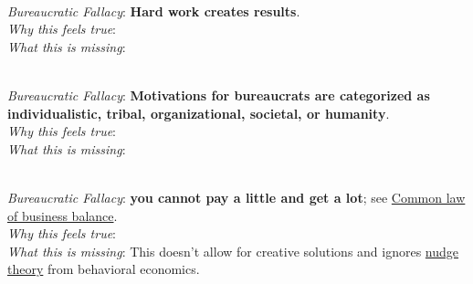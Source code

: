 \ \\

\textit{Bureaucratic Fallacy}: \textbf{Hard work creates results}.\\
\textit{Why this feels true}: \\
\textit{What this is missing}: 


\ \\

\textit{Bureaucratic Fallacy}: \textbf{Motivations for bureaucrats are categorized as individualistic, tribal, organizational, societal, or humanity}.\\
\textit{Why this feels true}: \\
\textit{What this is missing}: 


\ \\

\textit{Bureaucratic Fallacy}: \textbf{you cannot pay a little and get a lot}; see \href{https://en.wikipedia.org/wiki/Common_law_of_business_balance}{Common law of business balance}. \\
\textit{Why this feels true}: \\
\textit{What this is missing}: This doesn't allow for creative solutions and ignores \href{https://en.wikipedia.org/wiki/Nudge_theory}{nudge theory} from behavioral economics. 

